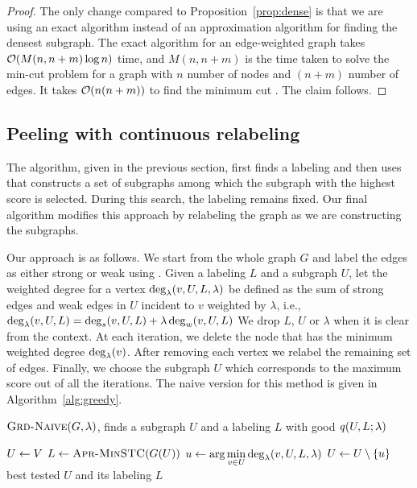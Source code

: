 \begin{proof}
The only change compared to Proposition~\ref{prop:dense} is that we are using an exact algorithm instead of an approximation algorithm for finding the densest subgraph.
The exact algorithm for an edge-weighted graph takes $\bigO{ M(n, n + m)\log n}$ time, and $M(n, n + m)$ is the time taken to solve the min-cut problem for a graph with $n$ number of nodes and $(n + m)$ number of edges.
It takes $\bigO{n (n + m)}$ to find the minimum cut
\cite{orlin2013max}. The claim follows.
\end{proof}

\subsection{Peeling with continuous relabeling}\label{sec:greedy}

The \algdensec algorithm, given in the previous section, first finds a labeling and then uses \algdc that constructs a set of subgraphs among which the subgraph with the highest score is selected. During this search, the labeling remains fixed. Our final algorithm modifies this approach by relabeling the graph as we are constructing the subgraphs.

Our approach is as follows. 
We start from the whole graph $G$ and label the edges as either strong or weak using \algminstc. 
Given a labeling $L$ and a subgraph $U$, let the weighted degree for a vertex $\scorev{v, U, L, \lambda}$ be defined as the sum of strong edges and weak edges in $U$ incident to $v$ weighted by $\lambda$, i.e., $\scorev{v, U, L} = \deg_s(v, U, L) + \lambda \deg_w(v, U, L)$ We drop $L$, $U$ or $\lambda$ when it is clear from the context.
At each iteration, we delete the node that has the minimum weighted degree $\scorev{v}$. After removing each vertex we relabel the remaining set of edges. Finally, we choose the subgraph $U$ which corresponds to the maximum score  out of all the iterations.
The naive version for this method is given in Algorithm~\ref{alg:greedy}.

\begin{algorithm}[t!]
\caption{$\textsc{Grd-Naive}(G, \lambda)$, finds a subgraph $U$ and a labeling $L$ with good $\score{U, L; \lambda}$}
\label{alg:greedy}
    $U \leftarrow V$\;
     {
        $L \leftarrow \textsc{Apr-MinSTC}(G(U))$\label{alg:minstc-step}\;
	$u \define \displaystyle\arg\min_{ v \in U} \scorev{v, U, L, \lambda}$\label{alg:score-step}\;
	$U \leftarrow U \setminus \left\{u\right\}$\;
    }
	\Return best tested $U$ and its labeling $L$\;
\end{algorithm}


